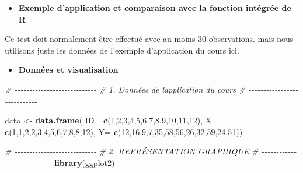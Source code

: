 \documentclass[
  12pt,
]{article}
\newenvironment{Shaded}{\begin{snugshade}}{\end{snugshade}}
\newcommand{\AttributeTok}[1]{\textcolor[rgb]{0.13,0.29,0.53}{#1}}
\newcommand{\CommentTok}[1]{\textcolor[rgb]{0.56,0.35,0.01}{\textit{#1}}}
\newcommand{\DecValTok}[1]{\textcolor[rgb]{0.00,0.00,0.81}{#1}}
\newcommand{\FunctionTok}[1]{\textcolor[rgb]{0.13,0.29,0.53}{\textbf{#1}}}
\newcommand{\NormalTok}[1]{#1}
\newcommand{\OtherTok}[1]{\textcolor[rgb]{0.56,0.35,0.01}{#1}}
\providecommand{\tightlist}{%
  \setlength{\itemsep}{0pt}\setlength{\parskip}{0pt}}
\begin{document}
\begin{itemize}
\tightlist
\item
  \textbf{Exemple d'application et comparaison avec la fonction intégrée
  de R}
\end{itemize}

Ce test doit normalement être effectué avec au moins 30 observations.
mais nous utilisons juste les données de l'exemple d'application du
cours ici.

\begin{itemize}
\tightlist
\item
  \textbf{Données et visualisation}
\end{itemize}

\begin{Shaded}
\begin{Highlighting}[]
\CommentTok{\# {-}{-}{-}{-}{-}{-}{-}{-}{-}{-}{-}{-}{-}{-}{-}{-}{-}{-}{-}{-}{-}{-}{-}{-}{-}{-}{-}{-}}
\CommentTok{\# 1. Données de l\textquotesingle{}application du cours}
\CommentTok{\# {-}{-}{-}{-}{-}{-}{-}{-}{-}{-}{-}{-}{-}{-}{-}{-}{-}{-}{-}{-}{-}{-}{-}{-}{-}{-}{-}{-}}

\NormalTok{data }\OtherTok{\textless{}{-}} \FunctionTok{data.frame}\NormalTok{(}
  \AttributeTok{ID=} \FunctionTok{c}\NormalTok{(}\DecValTok{1}\NormalTok{,}\DecValTok{2}\NormalTok{,}\DecValTok{3}\NormalTok{,}\DecValTok{4}\NormalTok{,}\DecValTok{5}\NormalTok{,}\DecValTok{6}\NormalTok{,}\DecValTok{7}\NormalTok{,}\DecValTok{8}\NormalTok{,}\DecValTok{9}\NormalTok{,}\DecValTok{10}\NormalTok{,}\DecValTok{11}\NormalTok{,}\DecValTok{12}\NormalTok{),}
  \AttributeTok{X=} \FunctionTok{c}\NormalTok{(}\DecValTok{1}\NormalTok{,}\DecValTok{1}\NormalTok{,}\DecValTok{2}\NormalTok{,}\DecValTok{2}\NormalTok{,}\DecValTok{3}\NormalTok{,}\DecValTok{4}\NormalTok{,}\DecValTok{5}\NormalTok{,}\DecValTok{6}\NormalTok{,}\DecValTok{7}\NormalTok{,}\DecValTok{8}\NormalTok{,}\DecValTok{8}\NormalTok{,}\DecValTok{12}\NormalTok{),}
  \AttributeTok{Y=} \FunctionTok{c}\NormalTok{(}\DecValTok{12}\NormalTok{,}\DecValTok{16}\NormalTok{,}\DecValTok{9}\NormalTok{,}\DecValTok{7}\NormalTok{,}\DecValTok{35}\NormalTok{,}\DecValTok{58}\NormalTok{,}\DecValTok{56}\NormalTok{,}\DecValTok{26}\NormalTok{,}\DecValTok{32}\NormalTok{,}\DecValTok{59}\NormalTok{,}\DecValTok{24}\NormalTok{,}\DecValTok{51}\NormalTok{))}

\CommentTok{\# {-}{-}{-}{-}{-}{-}{-}{-}{-}{-}{-}{-}{-}{-}{-}{-}{-}{-}{-}{-}{-}{-}{-}{-}{-}{-}{-}{-}}
\CommentTok{\# 2. REPRÉSENTATION GRAPHIQUE}
\CommentTok{\# {-}{-}{-}{-}{-}{-}{-}{-}{-}{-}{-}{-}{-}{-}{-}{-}{-}{-}{-}{-}{-}{-}{-}{-}{-}{-}{-}{-}}
\FunctionTok{library}\NormalTok{(ggplot2)}


\end{Highlighting}
\end{Shaded}
\end{document}
